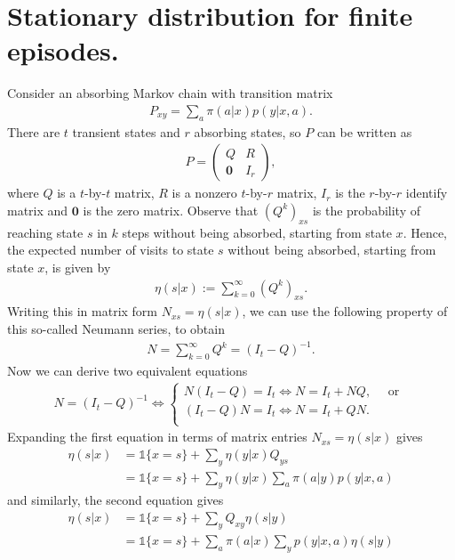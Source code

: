 \documentclass[a4paper]{report}
\theoremstyle{definition}
\theoremstyle{plain}
\begin{document}
\section{Stationary distribution for finite episodes.}
Consider an absorbing Markov chain with transition matrix
\begin{align*}
  P_{xy} = \sum_{a} \pi(a | x) p(y | x, a) .
\end{align*}
There are $t$ transient states and $r$ absorbing states, so $P$ can be written
as
\begin{align*}
  P = \begin{pmatrix}
        Q & R \\
        \mathbf{0} & I_{r}
      \end{pmatrix} ,
\end{align*}
where $Q$ is a $t$-by-$t$ matrix, $R$ is a nonzero $t$-by-$r$ matrix, $I_{r}$ is
the $r$-by-$r$ identify matrix and $\mathbf{0}$ is the zero matrix.
%
Observe that $(Q^{k})_{xs}$ is the probability of reaching state $s$ in $k$
steps without being absorbed, starting from state $x$. Hence, the expected
number of visits to state $s$ without being absorbed, starting from state $x$,
is given by
\begin{align*}
  \eta(s | x) := \sum_{k=0}^{\infty} (Q^{k})_{xs} .
\end{align*}
%
Writing this in matrix form $N_{xs} = \eta(s | x)$, we can use the following
property of this so-called Neumann series, to obtain
\begin{align*}
  N = \sum_{k=0}^{\infty} Q^{k} = {(I_{t} - Q)}^{-1} .
\end{align*}
Now we can derive two equivalent equations
\begin{align*}
  N = (I_{t} - Q)^{-1} \iff
  \begin{cases}
    N (I_{t} - Q) = I_{t} \iff N = I_{t} + NQ ,
    \quad  \text{ or }  \\
    (I_{t} - Q) N = I_{t} \iff N = I_{t} + QN . \\
  \end{cases}
\end{align*}
%
Expanding the first equation in terms of matrix entries $N_{xs} = \eta(s | x)$
gives
\begin{align*}
  \eta(s | x) &= \mathds{1}\{ x = s \} + \sum_{y}  \eta(y | x) Q_{ys} \\
  &= \mathds{1}\{ x = s \} +  \sum_{y}\eta(y | x) \sum_{a} \pi(a | y) p(y | x, a)
\end{align*}
and similarly, the second equation gives
\begin{align*}
  \eta(s | x) &= \mathds{1}\{ x = s \} + \sum_{y} Q_{xy} \eta(s | y) \\
  &= \mathds{1}\{ x = s \} +  \sum_{a} \pi(a | x) \sum_{y} p(y | x, a) \eta(s | y)
\end{align*}
\end{document}
